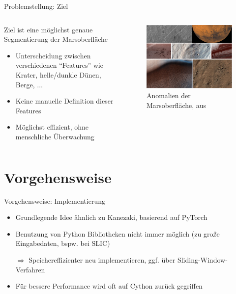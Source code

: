 \documentclass[9pt]{beamer}
\begin{document}
\begin{frame}{Problemstellung: Ziel}
\begin{columns}
	\begin{column}{.5\textwidth}
		Ziel ist eine möglichst genaue Segmentierung der Marsoberfläche
		\begin{itemize}
			\item Unterscheidung zwischen verschiedenen \enquote{Features} wie Krater, helle/dunkle Dünen, Berge, $\ldots$
			\item Keine manuelle Definition dieser Features
			\item Möglichst effizient, ohne menschliche Überwachung
		\end{itemize}
	\end{column}
	\begin{column}{.5\textwidth}
		\begin{figure}[H]
			\includegraphics[width=\textwidth, keepaspectratio]{surface.png}
			\caption{Anomalien der Marsoberfläche, aus \cite{sheriff_2019}}
		\end{figure}
	\end{column}
\end{columns}	
\end{frame}

\section{Vorgehensweise}

\begin{frame}{Vorgehensweise: Implementierung}
\begin{itemize}
	\item Grundlegende Idee ähnlich zu Kanezaki\cite{kanezaki2018_unsupervised_segmentation}, basierend auf PyTorch
	\item Benutzung von Python Bibliotheken nicht immer möglich (zu große Eingabedaten, bspw. bei SLIC\cite{slic})
	\item[$\Rightarrow$] Speichereffizienter neu implementieren, ggf. über Sliding-Window-Verfahren
	\item Für bessere Performance wird oft auf Cython\cite{behnel2010cython} zurück gegriffen
\end{itemize}	
\end{frame}
\end{document}
